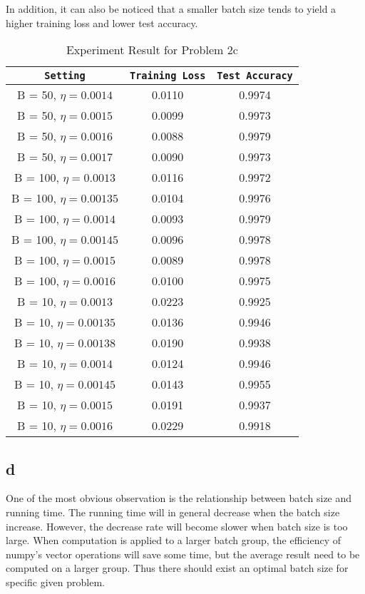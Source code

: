 \documentclass{article}
\begin{document}
In addition, it can also be noticed that a smaller batch size tends
to yield a higher training loss and lower test accuracy.
\begin{table} 
\centering
\begin{tabular}{c|c|c}
\texttt{Setting} & \texttt{Training Loss} & \texttt{Test Accuracy} \\
\hline
B = 50, $\eta = 0.0014$ & 0.0110 & 0.9974\\
\hline
B = 50, $\eta = 0.0015$ & 0.0099 & 0.9973\\
\hline
B = 50, $\eta = 0.0016$ & 0.0088 & 0.9979\\
\hline
B = 50, $\eta = 0.0017$ & 0.0090 & 0.9973\\
\hline
B = 100, $\eta = 0.0013$ & 0.0116 & 0.9972\\
\hline
B = 100, $\eta = 0.00135$ & 0.0104 & 0.9976\\
\hline
B = 100, $\eta = 0.0014$ & 0.0093 & 0.9979\\
\hline
B = 100, $\eta = 0.00145$ & 0.0096 & 0.9978\\
\hline
B = 100, $\eta = 0.0015$ & 0.0089 & 0.9978\\
\hline
B = 100, $\eta = 0.0016$ & 0.0100 & 0.9975\\ 
\hline
B = 10, $\eta = 0.0013$ & 0.0223& 0.9925\\
\hline
B = 10, $\eta = 0.00135$ & 0.0136& 0.9946\\
\hline
B = 10, $\eta = 0.00138$ & 0.0190& 0.9938\\
\hline
B = 10, $\eta = 0.0014$ & 0.0124& 0.9946\\
\hline
B = 10, $\eta = 0.00145$ & 0.0143 & 0.9955 \\
\hline
B = 10, $\eta = 0.0015$ & 0.0191& 0.9937\\
\hline
B = 10, $\eta = 0.0016$ & 0.0229 & 0.9918\\ 
\end{tabular}
\caption{Experiment Result for Problem 2c}
\label{tab:2c}
\end{table}

\subsection*{d}
One of the most obvious observation is the relationship between batch size and
running time. The running time will in general decrease when the batch size 
increase. However, the decrease rate will become slower when batch size is too
large. When computation is applied to a larger batch group, the efficiency of 
numpy's vector operations will save some time, but the average result need to be
computed on a larger group. Thus there should exist an optimal batch size for 
specific given problem.
\end{document}
